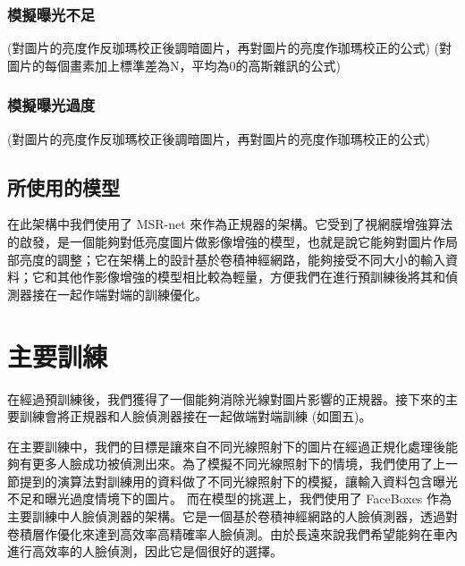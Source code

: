 \subsubsection{模擬曝光不足}
(對圖片的亮度作反珈瑪校正後調暗圖片，再對圖片的亮度作珈瑪校正的公式)
(對圖片的每個畫素加上標準差為N，平均為0的高斯雜訊的公式)

\subsubsection{模擬曝光過度}
(對圖片的亮度作反珈瑪校正後調暗圖片，再對圖片的亮度作珈瑪校正的公式)

\subsection{所使用的模型}
在此架構中我們使用了 MSR-net 來作為正規器的架構。它受到了視網膜增強算法的啟發，是一個能夠對低亮度圖片做影像增強的模型，也就是說它能夠對圖片作局部亮度的調整；它在架構上的設計基於卷積神經網路，能夠接受不同大小的輸入資料；它和其他作影像增強的模型相比較為輕量，方便我們在進行預訓練後將其和偵測器接在一起作端對端的訓練優化。

\section{主要訓練}
在經過預訓練後，我們獲得了一個能夠消除光線對圖片影響的正規器。接下來的主要訓練會將正規器和人臉偵測器接在一起做端對端訓練 (如圖五)。

在主要訓練中，我們的目標是讓來自不同光線照射下的圖片在經過正規化處理後能夠有更多人臉成功被偵測出來。為了模擬不同光線照射下的情境，我們使用了上一節提到的演算法對訓練用的資料做了不同光線照射下的模擬，讓輸入資料包含曝光不足和曝光過度情境下的圖片。
而在模型的挑選上，我們使用了 FaceBoxes 作為主要訓練中人臉偵測器的架構。它是一個基於卷積神經網路的人臉偵測器，透過對卷積層作優化來達到高效率高精確率人臉偵測。由於長遠來說我們希望能夠在車內進行高效率的人臉偵測，因此它是個很好的選擇。
